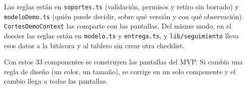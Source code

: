 \documentclass[11pt]{article}
\begin{document}
Las reglas están en \texttt{soportes.ts} (validación, permisos y retiro sin borrado) y \texttt{modeloDemo.ts} (quién puede decidir, sobre qué versión y con qué observación). \texttt{CortesDemoContext} las comparte con las pantallas. Del mismo modo, en el dossier las reglas están en \texttt{modelo.ts} y \texttt{entrega.ts}, y \texttt{lib/seguimiento} lleva esos datos a la bitácora y al tablero sin crear otra checklist.


Con estos 33 componentes se construyen las pantallas del MVP. Si cambia una regla de diseño (un color, un tamaño), se corrige en un solo componente y el cambio llega a todas las pantallas.
\end{document}
